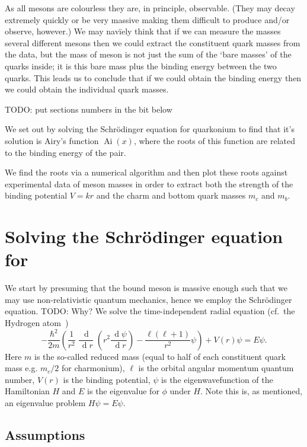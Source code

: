 \documentclass[]{article}
\renewcommand{\d}[1]{\ensuremath{\,\operatorname{d}\!{#1}}}
\newcommand{\Ai}[1]{\ensuremath{\operatorname{Ai}({#1})}}
\begin{document}
As all mesons are colourless they are, in principle, observable. (They may decay extremely quickly or be very massive making them difficult to produce and/or observe, however.) We may nav\"{i}ely think that if we can measure the masses several different mesons then we could extract the constituent quark masses from the data, but the mass of meson is not just the sum of the `bare masses' of the quarks inside; it is this bare mass plus the binding energy between the two quarks. This leads us to conclude that if we could obtain the binding energy then we could obtain the individual quark masses.

TODO: put sections numbers in the bit below

We set out by solving the Schr\"{o}dinger equation for quarkonium to find that it's solution is Airy's function $\Ai{x}$, where the roots of this function are related to the binding energy of the \qqbar pair.

We find the roots via a numerical algorithm and then plot these roots against experimental data of meson masses in order to extract both the strength of the binding potential $V=kr$ and the charm and bottom quark masses $m_{c}$ and $m_{b}$.


\section{Solving the Schr\"{o}dinger equation for \qqbar}\label{sec:schrodinger}

We start by presuming that the bound \qqbar meson is massive enough such that we may use non-relativistic quantum mechanics, hence we employ the Schr\"{o}dinger equation. TODO: Why? We solve the time-independent radial equation (cf.\ the Hydrogen atom~\cite{ref:dgriffithsquantum})
\begin{equation}\label{eqn:schrodinger}
-\frac{\hbar^{2}}{2m}\left (
	\frac{1}{r^{2}} \frac{\d{}}{\d{r}} \left (
		r^{2} \frac{\d{\psi}}{\d{r}}
	\right )
	- \frac{\ell(\ell+1)}{r^{2}}\psi
\right )
+ V(r)\psi = E\psi.
\end{equation}
Here $m$ is the so-called reduced mass (equal to half of each constituent quark mass e.g. $m_{c}/2$ for charmonium), $\ell$ is the orbital angular momentum quantum number, $V(r)$ is the binding potential, $\psi$ is the eigenwavefunction of the Hamiltonian $H$ and $E$ is the eigenvalue for $\phi$ under $H$. Note this is, as mentioned, an eigenvalue problem $H\psi=E\psi$.

\subsection{Assumptions}\label{ssec:assumptions}
\end{document}
